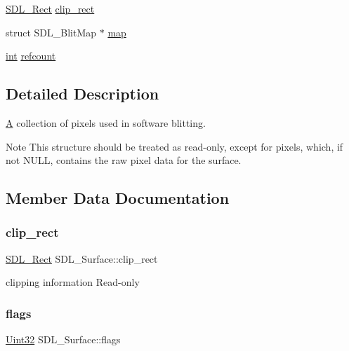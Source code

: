 \begin{DoxyCompactItemize}
\item 
\mbox{\hyperlink{struct_s_d_l___rect}{S\+D\+L\+\_\+\+Rect}} \mbox{\hyperlink{struct_s_d_l___surface_aa9a0da3b38261dad6cf0cc4e3bb5b0c3}{clip\+\_\+rect}}
\item 
struct S\+D\+L\+\_\+\+Blit\+Map $\ast$ \mbox{\hyperlink{struct_s_d_l___surface_a8c1ecad399b0d4f525b1a53b6ee9393f}{map}}
\item 
\mbox{\hyperlink{warnings_8h_a74f207b5aa4ba51c3a2ad59b219a423b}{int}} \mbox{\hyperlink{struct_s_d_l___surface_a03d10628a359c0674f5ceffd574f1641}{refcount}}
\end{DoxyCompactItemize}


\subsection{Detailed Description}
\mbox{\hyperlink{struct_a}{A}} collection of pixels used in software blitting. 

\begin{DoxyNote}{Note}
This structure should be treated as read-\/only, except for {\ttfamily pixels}, which, if not N\+U\+LL, contains the raw pixel data for the surface. 
\end{DoxyNote}


\subsection{Member Data Documentation}
\mbox{\label{struct_s_d_l___surface_aa9a0da3b38261dad6cf0cc4e3bb5b0c3}} 
\subsubsection{\texorpdfstring{clip\_rect}{clip\_rect}}
{\footnotesize\ttfamily \mbox{\hyperlink{struct_s_d_l___rect}{S\+D\+L\+\_\+\+Rect}} S\+D\+L\+\_\+\+Surface\+::clip\+\_\+rect}

clipping information Read-\/only \mbox{\label{struct_s_d_l___surface_a86d78b665d5dfd7aa1dd9696b067641b}} 
\subsubsection{\texorpdfstring{flags}{flags}}
{\footnotesize\ttfamily \mbox{\hyperlink{_s_d_l__stdinc_8h_add440eff171ea5f55cb00c4a9ab8672d}{Uint32}} S\+D\+L\+\_\+\+Surface\+::flags}

